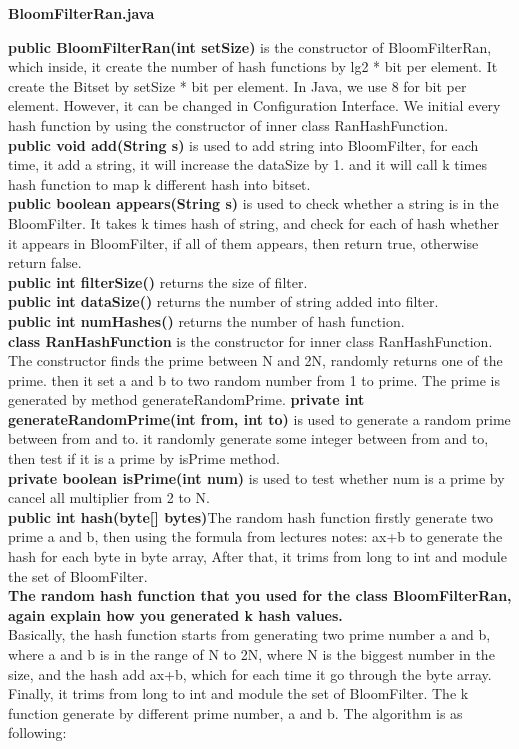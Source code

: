 \documentclass[a4paper,14pt]{article}
\begin{document}
\clearpage

\begin{center}
\textbf{{\large BloomFilterRan.java}}
\end{center}
\textbf{public BloomFilterRan(int setSize)} is the constructor of BloomFilterRan, which inside, it create the number of hash functions by lg2 * bit per element. It create the Bitset by setSize * bit per element. In Java, we use 8 for bit per element. However, it can be changed in Configuration Interface. We initial every hash function by using the constructor of inner class RanHashFunction.
\\[6pt]
\textbf{public void add(String s)} is used to add string into BloomFilter, for each time, it add a string, it will increase the dataSize by 1. and it will call k times hash function to map k different hash into bitset.
\\[6pt]
\textbf{public boolean appears(String s)} is used to check whether a string is in the BloomFilter. It takes k times hash of string, and check for each of hash whether it appears in BloomFilter,  if all of them appears, then return true, otherwise return false.
\\[6pt]
\textbf{public int filterSize()} returns the size of filter.
\\[6pt]
\textbf{public int dataSize()} returns the number of string added into filter.
\\[6pt]
\textbf{public int numHashes()} returns the number of hash function.
\\[6pt]
\textbf{class RanHashFunction} is the constructor for inner class RanHashFunction. The constructor finds the prime between N and 2N, randomly returns one of the prime. then it set a and b to two random number from 1 to prime. The prime is generated by method generateRandomPrime.
\textbf{private int generateRandomPrime(int from, int to)} is used to generate a random prime between from and to. it randomly generate some integer between from and to, then test if it is a prime by isPrime method.
\\[6pt]
\textbf{private boolean isPrime(int num)} is used to test whether num is a prime by cancel all multiplier from 2 to N. 
\\[6pt]
\textbf{public int hash(byte[] bytes)}The random hash function firstly generate two prime a and b, then using the formula from lectures notes: ax+b to generate the hash for each byte in byte array, After that, it trims from long to int and module the set of BloomFilter.
\\[6pt]
\textbf{The random hash function that you used for the class BloomFilterRan, again explain how you generated k hash values.}
\\[6pt]
Basically, the hash function starts from generating two prime number a and b, where a and b is in the range of N to 2N, where N is the biggest number in the size, and the hash add ax+b, which for each time it go through the byte array. Finally, it trims from long to int and module the set of BloomFilter. The k function generate by different prime number, a and b. The algorithm is as following:
\end{document}
